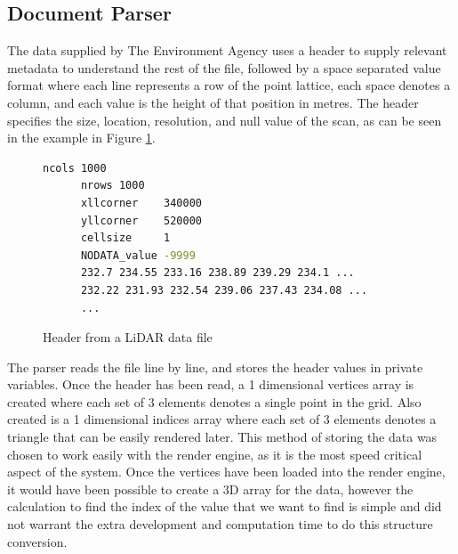\documentclass[12pt,a4paper]{article}
\begin{document}
  \subsection{Document Parser}
  \noindent The data supplied by The Environment Agency uses a header to supply relevant metadata to understand the rest of the file, followed by a space separated value format where each line represents a row of the point lattice, each space denotes a column, and each value is the height of that position in metres. The header specifies the size, location, resolution, and null value of the scan, as can be seen in the example in Figure \ref{file_header}.

  \begin{figure}[htb]
    \begin{lstlisting}[language=bash]
      ncols 1000
      nrows 1000
      xllcorner    340000
      yllcorner    520000
      cellsize     1
      NODATA_value -9999
      232.7 234.55 233.16 238.89 239.29 234.1 ...
      232.22 231.93 232.54 239.06 237.43 234.08 ...
      ...
    \end{lstlisting}
    \caption{Header from a LiDAR data file}
    \label{file_header}
  \end{figure}

  \par The parser reads the file line by line, and stores the header values in private variables. Once the header has been read, a 1 dimensional vertices array is created where each set of 3 elements denotes a single point in the grid. Also created is a 1 dimensional indices array where each set of 3 elements denotes a triangle that can be easily rendered later. This method of storing the data was chosen to work easily with the render engine, as it is the most speed critical aspect of the system. Once the vertices have been loaded into the render engine, it would have been possible to create a 3D array for the data, however the calculation to find the index of the value that we want to find is simple and did not warrant the extra development and computation time to do this structure conversion.
\end{document}
